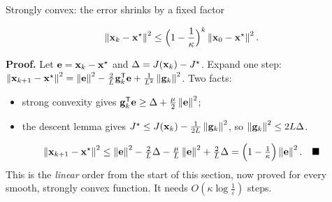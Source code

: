 \begin{frame}{Strongly convex: the error shrinks by a fixed factor}
  \begin{thmbox}[Theorem ($L$-smooth, $\mu$-strongly convex, $\alpha = 1/L$)]
    \[ \left\lVert \mathbf{x}_k - \mathbf{x}^\star \right\rVert^2 \le \Bigl(1 - \frac1\kappa\Bigr)^{k}\left\lVert \mathbf{x}_0 - \mathbf{x}^\star \right\rVert^2 . \]
  \end{thmbox}
  \small\textbf{Proof.} Let $\mathbf{e} = \mathbf{x}_k - \mathbf{x}^\star$ and $\Delta = J(\mathbf{x}_k) - J^\star$. Expand one step:
  $\left\lVert \mathbf{x}_{k+1} - \mathbf{x}^\star \right\rVert^2 = \left\lVert \mathbf{e} \right\rVert^2 - \tfrac2L\mathbf{g}_k^{\mathsf T}\mathbf{e} + \tfrac1{L^2}\left\lVert \mathbf{g}_k \right\rVert^2$. Two facts:
  \begin{itemize}\footnotesize
    \item strong convexity gives $\mathbf{g}_k^{\mathsf T}\mathbf{e} \ge \Delta + \tfrac\mu2\left\lVert \mathbf{e} \right\rVert^2$;
    \item the descent lemma gives $J^\star \le J(\mathbf{x}_k) - \tfrac1{2L}\left\lVert \mathbf{g}_k \right\rVert^2$, so $\left\lVert \mathbf{g}_k \right\rVert^2 \le 2L\Delta$.
  \end{itemize}
  \[
    \left\lVert \mathbf{x}_{k+1} - \mathbf{x}^\star \right\rVert^2 \le \left\lVert \mathbf{e} \right\rVert^2 - \tfrac2L\Delta - \tfrac\mu L\left\lVert \mathbf{e} \right\rVert^2 + \tfrac2L\Delta
    = \Bigl(1 - \tfrac1\kappa\Bigr)\left\lVert \mathbf{e} \right\rVert^2 . \quad\blacksquare
  \]
  \footnotesize This is the \emph{linear} order from the start of this section, now proved for every smooth, strongly convex function. It needs $O(\kappa\log\tfrac1\varepsilon)$ steps.
\end{frame}

